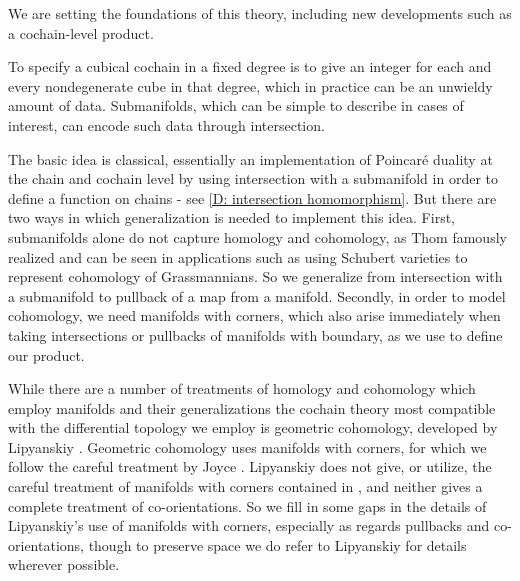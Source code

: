 We are setting the foundations of this theory, including new developments such as a cochain-level product.


To specify a cubical  cochain in a fixed degree is to give an integer for each and every {nondegenerate cube} in that degree,
which in practice can be an unwieldy amount of data.
Submanifolds, which can be simple to describe in cases of interest, can encode such data through intersection.

The basic idea is classical, essentially an implementation of Poincar\'e duality at the chain and cochain level by using intersection with a
submanifold in order to define a function on chains - see \cref{D: intersection homomorphism}.
But there are two ways in which  generalization is needed to implement this idea.
First, submanifolds alone do not capture homology and cohomology, as Thom famously realized and can be
seen in applications such as using Schubert varieties to represent cohomology of Grassmannians.
So we generalize from intersection with a submanifold to pullback of a map from a manifold.
Secondly, in order to model cohomology, we need manifolds with corners, which also arise immediately when taking intersections or pullbacks of manifolds with boundary, as we use to define our product.

While there are a number of treatments of homology and cohomology which employ manifolds and their
generalizations \cite{Whit47, BRS76,  FeSj83, Krec10,  Kahn01, Zing08, Joyc15} the cochain theory most compatible with the differential topology we employ is geometric cohomology, developed by Lipyanskiy \cite{Lipy14}.
Geometric cohomology uses manifolds with corners, for which we follow the careful treatment by Joyce \cite{Joy12}.
Lipyanskiy does not give, or utilize, the careful treatment of manifolds with corners contained in \cite{Joy12}, and neither gives a complete treatment of co-orientations. So we fill in some gaps in the details of Lipyanskiy's use of manifolds with corners, especially as regards pullbacks and co-orientations, though to preserve space we do refer to Lipyanskiy for details wherever possible.




